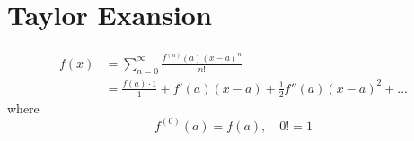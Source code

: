 \documentclass[12pt]{article}
\begin{document}
\section{Taylor Exansion}
\begin{align*}
f(x)&= \sum\limits_{n = 0} ^\infty \frac{f^{(n)}(a)(x - a)^{n}}{n!}\\
&= \frac{f(a)\cdot 1}{1} + f'(a)(x - a) + \frac{1}{2}f''(a)(x - a)^{2} + ...
\end{align*}
where
\begin{equation*}
f^{(0)}(a) = f(a), \quad 0! = 1
\end{equation*}









\end{document}
